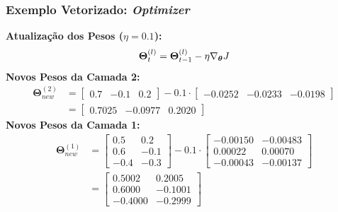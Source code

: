 \documentclass[aspectratio=169, xcolor=dvipsnames]{beamer}
\begin{document}
  \begin{frame}
    \frametitle{Exemplo Vetorizado: \textit{Optimizer}}
    \small
    \textbf{Atualização dos Pesos ($\eta = 0.1$):}
    \[
      \mathbf{\Theta}_{t}^{(l)}=\mathbf{\Theta}_{t-1}^{(l)}-\eta\nabla_{\bm{\theta}}J
    \]
    \vfill
    \textbf{Novos Pesos da Camada 2:}
    \begin{align*}
      \mathbf{\Theta}_{new}^{(2)}&=
      \begin{bmatrix}
        0.7 & -0.1 & 0.2
      \end{bmatrix}
      - 0.1 \cdot
      \begin{bmatrix}
        -0.0252 & -0.0233 & -0.0198
      \end{bmatrix}\\
      &=
      \begin{bmatrix}
        0.7025 & -0.0977 & 0.2020
      \end{bmatrix}
    \end{align*}
    \vfill
    \textbf{Novos Pesos da Camada 1:}
    \begin{align*}
      \mathbf{\Theta}_{new}^{(1)}&=
      \begin{bmatrix}
        0.5  & 0.2  \\
        0.6  & -0.1 \\
        -0.4 & -0.3
      \end{bmatrix}
      - 0.1 \cdot
           \begin{bmatrix}
        -0.00150 & -0.00483 \\
        0.00022  & 0.00070  \\
        -0.00043 & -0.00137
      \end{bmatrix}\\
      &=
      \begin{bmatrix}
        0.5002  & 0.2005   \\
        0.6000  & -0.1001 \\
        -0.4000 & -0.2999
      \end{bmatrix}
    \end{align*}
  \end{frame}
\end{document}
